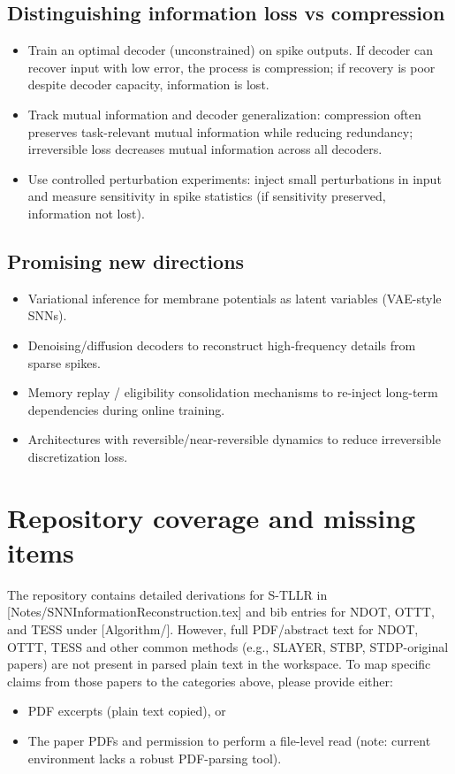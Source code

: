 \documentclass{article}
\begin{document}
\subsection{Distinguishing information loss vs compression}
\begin{itemize}
  \item Train an optimal decoder (unconstrained) on spike outputs. If decoder can recover input with low error, the process is compression; if recovery is poor despite decoder capacity, information is lost.
  \item Track mutual information and decoder generalization: compression often preserves task-relevant mutual information while reducing redundancy; irreversible loss decreases mutual information across all decoders.
  \item Use controlled perturbation experiments: inject small perturbations in input and measure sensitivity in spike statistics (if sensitivity preserved, information not lost).
\end{itemize}

\subsection{Promising new directions}
\begin{itemize}
  \item Variational inference for membrane potentials as latent variables (VAE-style SNNs).
  \item Denoising/diffusion decoders to reconstruct high-frequency details from sparse spikes.
  \item Memory replay / eligibility consolidation mechanisms to re-inject long-term dependencies during online training.
  \item Architectures with reversible/near-reversible dynamics to reduce irreversible discretization loss.
\end{itemize}

\section{Repository coverage and missing items}
The repository contains detailed derivations for S-TLLR in [Notes/SNNInformationReconstruction.tex] and bib entries for NDOT, OTTT, and TESS under [Algorithm/]. However, full PDF/abstract text for NDOT, OTTT, TESS and other common methods (e.g., SLAYER, STBP, STDP-original papers) are not present in parsed plain text in the workspace. To map specific claims from those papers to the categories above, please provide either:
\begin{itemize}
  \item PDF excerpts (plain text copied), or
  \item The paper PDFs and permission to perform a file-level read (note: current environment lacks a robust PDF-parsing tool). 
\end{itemize}
\end{document}
